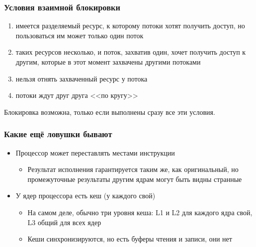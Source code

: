 \documentclass{../../slides-style}
\begin{document}
    \begin{frame}
        \frametitle{Условия взаимной блокировки}
        \begin{enumerate}
            \item имеется разделяемый ресурс, к которому потоки хотят получить доступ, но пользоваться им может только один поток
            \item таких ресурсов несколько, и поток, захватив один, хочет получить доступ к другим, которые в этот момент захвачены другими потоками
            \item нельзя отнять захваченный ресурс у потока
            \item потоки ждут друг друга <<по кругу>>
        \end{enumerate}
        Блокировка возможна, только если выполнены сразу все эти условия.
    \end{frame}

    \begin{frame}
        \frametitle{Какие ещё ловушки бывают}
        \begin{itemize}
            \item Процессор может переставлять местами инструкции
            \begin{itemize}
                \item Результат исполнения гарантируется таким же, как оригинальный, но промежуточные результаты другим 
                    ядрам могут быть видны странные
            \end{itemize}
            \item У ядер процессора есть кеш (у каждого свой)
            \begin{itemize}
                \item На самом деле, обычно три уровня кеша: L1 и L2 для каждого ядра свой, L3 общий для всех ядер
                \item Кеши синхронизируются, но есть буферы чтения и записи, они нет
            \end{itemize}
        \end{itemize}
    \end{frame}
\end{document}

